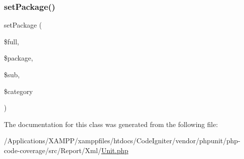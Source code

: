 \subsubsection{\texorpdfstring{set\+Package()}{setPackage()}}
{\footnotesize\ttfamily set\+Package (\begin{DoxyParamCaption}\item[{}]{\$full,  }\item[{}]{\$package,  }\item[{}]{\$sub,  }\item[{}]{\$category }\end{DoxyParamCaption})}



The documentation for this class was generated from the following file\+:\begin{DoxyCompactItemize}
\item 
/\+Applications/\+X\+A\+M\+P\+P/xamppfiles/htdocs/\+Code\+Igniter/vendor/phpunit/php-\/code-\/coverage/src/\+Report/\+Xml/\mbox{\hyperlink{_unit_8php}{Unit.\+php}}\end{DoxyCompactItemize}
